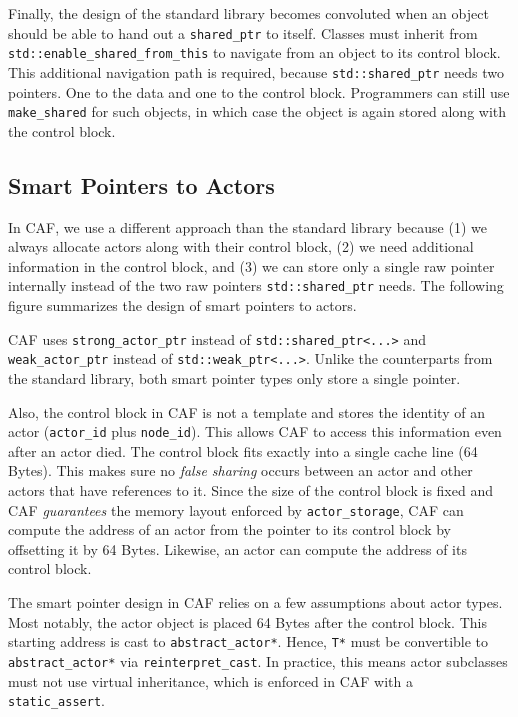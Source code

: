 
Finally, the design of the standard library becomes convoluted when an object
should be able to hand out a \lstinline^shared_ptr^ to itself. Classes must
inherit from \lstinline^std::enable_shared_from_this^ to navigate from an
object to its control block. This additional navigation path is required,
because \lstinline^std::shared_ptr^ needs two pointers. One to the data and one
to the control block. Programmers can still use \lstinline^make_shared^ for
such objects, in which case the object is again stored along with the control
block.

\subsection{Smart Pointers to Actors}

In CAF, we use a different approach than the standard library because (1) we
always allocate actors along with their control block, (2) we need additional
information in the control block, and (3) we can store only a single raw
pointer internally instead of the two raw pointers \lstinline^std::shared_ptr^
needs. The following figure summarizes the design of smart pointers to actors.


CAF uses \lstinline^strong_actor_ptr^ instead of
\lstinline^std::shared_ptr<...>^ and \lstinline^weak_actor_ptr^ instead of
\lstinline^std::weak_ptr<...>^. Unlike the counterparts from the standard
library, both smart pointer types only store a single pointer.

Also, the control block in CAF is not a template and stores the identity of an
actor (\lstinline^actor_id^ plus \lstinline^node_id^). This allows CAF to
access this information even after an actor died. The control block fits
exactly into a single cache line (64 Bytes). This makes sure no \emph{false
sharing} occurs between an actor and other actors that have references to it.
Since the size of the control block is fixed and CAF \emph{guarantees} the
memory layout enforced by \lstinline^actor_storage^, CAF can compute the
address of an actor from the pointer to its control block by offsetting it by
64 Bytes. Likewise, an actor can compute the address of its control block.

The smart pointer design in CAF relies on a few assumptions about actor types.
Most notably, the actor object is placed 64 Bytes after the control block. This
starting address is cast to \lstinline^abstract_actor*^. Hence, \lstinline^T*^
must be convertible to \lstinline^abstract_actor*^ via
\lstinline^reinterpret_cast^. In practice, this means actor subclasses must not
use virtual inheritance, which is enforced in CAF with a
\lstinline^static_assert^.

